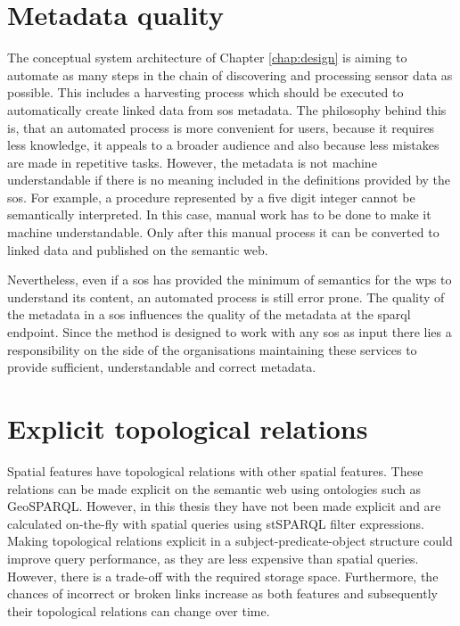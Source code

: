 \section{Metadata quality}
\label{metaqua}
The conceptual system architecture of Chapter \ref{chap:design} is aiming to automate as many steps in the chain of discovering and processing sensor data as possible. This includes a harvesting process which should be executed to automatically create linked data from \ac{sos} metadata. The philosophy behind this is, that an automated process is more convenient for users, because it requires less knowledge, it appeals to a broader audience and also because less mistakes are made in repetitive tasks. However, the metadata is not machine understandable if there is no meaning included in the definitions provided by the \ac{sos}. For example, a procedure represented by a five digit integer cannot be semantically interpreted. In this case, manual work has to be done to make it machine understandable. Only after this manual process it can be converted to linked data and published on the semantic web. 

Nevertheless, even if a \ac{sos} has provided the minimum of semantics for the \ac{wps} to understand its content, an automated process is still error prone. The quality of the metadata in a \ac{sos} influences the quality of the metadata at the \ac{sparql} endpoint. Since the method is designed to work with any \ac{sos} as input there lies a responsibility on the side of the organisations maintaining these services to provide sufficient, understandable and correct metadata.   
 

\section{Explicit topological relations}
\label{expltr}
Spatial features have topological relations with other spatial features. These relations can be made explicit on the semantic web using ontologies such as GeoSPARQL. However, in this thesis they have not been made explicit and are calculated on-the-fly with spatial queries using stSPARQL filter expressions. Making topological relations explicit in a subject-predicate-object structure could improve query performance, as they are less expensive than spatial queries. However, there is a trade-off with the required storage space. Furthermore, the chances of incorrect or broken links increase as both features and subsequently their topological relations can change over time. 

